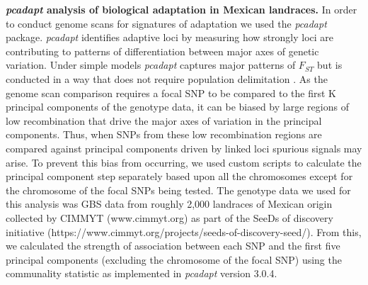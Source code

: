\documentclass[9pt,twocolumn,twoside,lineno]{biorxiv}
\begin{document}
\textbf{\textit{pcadapt} analysis of biological adaptation in Mexican landraces.}
In order to conduct genome scans for signatures of adaptation we used the \textit{pcadapt} \cite{Luu2017-ws} package.
\textit{pcadapt} identifies adaptive loci by measuring how strongly loci are contributing to patterns of differentiation between major axes of genetic variation.
Under simple models \textit{pcadapt} captures major patterns of $F_{ST}$  but is conducted in a way that does not require population delimitation \cite{duforet2014genome}.
As the genome scan comparison requires a focal SNP to be compared to the first K principal components of the genotype data, it can be biased by large regions of low recombination that drive the major axes of variation in the principal components.
Thus, when SNPs from these low recombination regions are compared against principal components driven by linked loci spurious signals may arise.
To prevent this bias from occurring, we used custom scripts to calculate the principal component step separately based upon all the chromosomes except for the chromosome of the focal SNPs being tested.
The genotype data we used for this analysis was GBS data from roughly 2,000 landraces of Mexican origin collected by CIMMYT (www.cimmyt.org) as part of the SeeDs of discovery initiative (https://www.cimmyt.org/projects/seeds-of-discovery-seed/).
From this, we calculated the strength of association between each SNP and the first five principal components (excluding the chromosome of the focal SNP) using the communality statistic as implemented in \textit{pcadapt} version 3.0.4.
\end{document}
